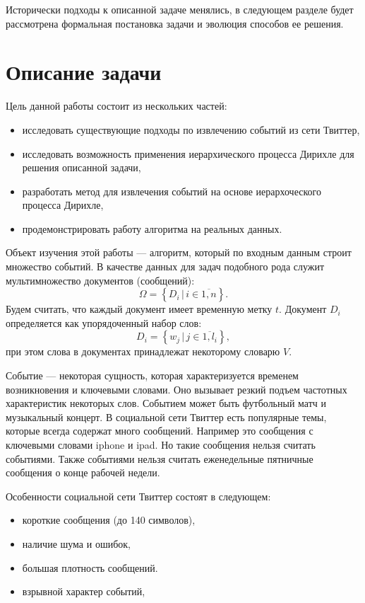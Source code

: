 \documentclass[12pt, a4paper]{article}
\begin{document}
	Исторически подходы к описанной задаче менялись, в следующем разделе будет рассмотрена формальная постановка задачи и эволюция способов ее решения.
	
  \section{Описание задачи}
	Цель данной работы состоит из нескольких частей:
\begin{itemize}
\item исследовать существующие подходы по извлечению событий из сети Твиттер,
\item исследовать возможность применения иерархического процесса Дирихле для решения описанной задачи,
\item разработать метод для извлечения событий на основе иерархоческого процесса Дирихле,
\item продемонстрировать работу алгоритма на реальных данных.
\end{itemize}	  
  
  Объект изучения этой работы --- алгоритм, который по входным данным строит множество событий. В качестве данных для задач подобного рода служит мультимножество документов (сообщений):
\begin{equation}
  \Omega = \left\{D_i \,\vert\, i \in \overline{1,n} \right\}.
  \end{equation}  
  Будем считать, что каждый документ имеет временную метку $t$. Документ $D_i$ определяется как упорядоченный набор слов:
\begin{equation}
  D_i = \left\{w_j \,\vert\, j \in \overline{ 1, l_i } \right\},
  \end{equation}  
   при этом слова в документах принадлежат некоторому словарю $V$. 
  
  Событие --- некоторая сущность, которая характеризуется временем возникновения и ключевыми словами. Оно вызывает резкий подъем частотных характеристик некоторых слов. Событием может быть футбольный матч и музыкальный концерт. В социальной сети Твиттер есть популярные темы, которые всегда содержат много сообщений. Например это сообщения с ключевыми словами iphone и ipad. Но такие сообщения нельзя считать событиями. Также событиями нельзя считать еженедельные пятничные сообщения о конце рабочей недели\cite{waim13}.
  
  Особенности социальной сети Твиттер состоят в следующем:
  \begin{itemize}
  \item короткие сообщения (до 140 символов),
  \item наличие шума и ошибок,
  \item большая плотность сообщений.
  \item взрывной характер событий,
  \end{itemize}
  
\end{document}
